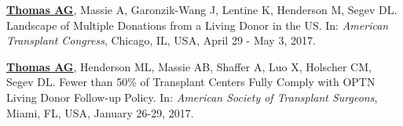 \documentclass[10pt]{article}
\makeatletter
\newlength{\bibhang}
\newlength{\bibsep}
 {\@listi \global\bibsep\itemsep \global\advance\bibsep by\parsep}
\newenvironment{bibenum*}
  {\renewcommand\labelenumi{[\theenumi]}%
   \etaremune[
     topsep=0pt,
     itemsep=\bibsep,
     parsep=0pt,partopsep=0pt,
     itemindent=-\bibhang,
     leftmargin={\bibhang+\widthof{[999]}}]}
  {\endetaremune}
\makeatother
\begin{document}
\begin{bibenum*}
\item \underline{\textbf{Thomas AG}}, Massie A, Garonzik-Wang J,
  Lentine K, Henderson M, Segev DL.
  Landscape of Multiple Donations from a Living Donor in the US.
  In: \emph{American Transplant Congress},
  Chicago, IL, USA, April 29 - May 3, 2017.




\item \underline{\textbf{Thomas AG}}, Henderson ML, Massie AB, Shaffer A,
  Luo X, Holscher CM, Segev DL. Fewer than 50\% of Transplant Centers Fully
  Comply with OPTN Living Donor Follow-up Policy.
  In: \emph{American Society of Transplant Surgeons},
  Miami, FL, USA, January 26-29, 2017.




\end{bibenum*}
\end{document}
